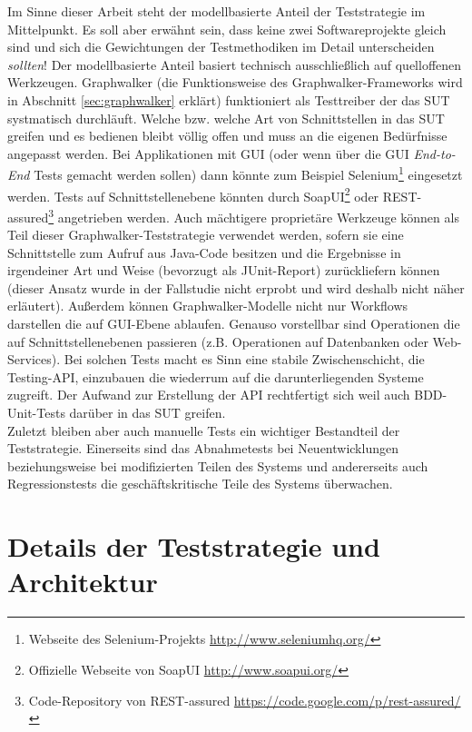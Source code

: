 Im Sinne dieser Arbeit steht der modellbasierte Anteil der Teststrategie im Mittelpunkt. Es soll aber erwähnt sein, dass keine zwei Softwareprojekte gleich sind und sich die Gewichtungen der Testmethodiken im Detail unterscheiden \textit{sollten}! Der modellbasierte Anteil basiert technisch ausschließlich auf quelloffenen Werkzeugen. Graphwalker (die Funktionsweise des Graphwalker-Frameworks wird in Abschnitt \ref{sec:graphwalker} erklärt) funktioniert als Testtreiber der das \Gls{SUT} systmatisch durchläuft. Welche bzw. welche Art von Schnittstellen in das \Gls{SUT} greifen und es bedienen bleibt völlig offen und muss an die eigenen Bedürfnisse angepasst werden. Bei Applikationen mit GUI (oder wenn über die GUI \textit{End-to-End} Tests gemacht werden sollen) dann könnte zum Beispiel Selenium\footnote{Webseite des Selenium-Projekts \url{http://www.seleniumhq.org/}} eingesetzt werden. Tests auf Schnittstellenebene könnten durch SoapUI\footnote{ Offizielle Webseite von SoapUI \url{http://www.soapui.org/}} oder REST-assured\footnote{Code-Repository von REST-assured \url{https://code.google.com/p/rest-assured/}} angetrieben werden. Auch mächtigere proprietäre Werkzeuge können als Teil dieser Graphwalker-Teststrategie verwendet werden, sofern sie eine Schnittstelle zum Aufruf aus Java-Code besitzen und die Ergebnisse in irgendeiner Art und Weise (bevorzugt als JUnit-Report) zurückliefern können (dieser Ansatz wurde in der Fallstudie nicht erprobt und wird deshalb nicht näher erläutert). Außerdem können Graphwalker-Modelle nicht nur Workflows darstellen die auf GUI-Ebene ablaufen. Genauso vorstellbar sind Operationen die auf Schnittstellenebenen passieren (z.B. Operationen auf Datenbanken oder Web-Services). Bei solchen Tests macht es Sinn eine stabile Zwischenschicht, die Testing-API, einzubauen die wiederrum auf die darunterliegenden Systeme zugreift. Der Aufwand zur Erstellung der API rechtfertigt sich weil auch \Gls{BDD}-Unit-Tests darüber in das \Gls{SUT} greifen.\\
Zuletzt bleiben aber auch manuelle Tests ein wichtiger Bestandteil der Teststrategie. Einerseits sind das Abnahmetests bei Neuentwicklungen beziehungsweise bei modifizierten Teilen des Systems und andererseits auch Regressionstests die geschäftskritische Teile des Systems überwachen.

\section{Details der Teststrategie und Architektur}

